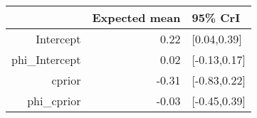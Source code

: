 \begin{tabular}{rrl}
  \hline
 & Expected mean & 95\% CrI \\ 
  \hline
Intercept & 0.22 & [0.04,0.39] \\ 
  phi\_Intercept & 0.02 & [-0.13,0.17] \\ 
  cprior & -0.31 & [-0.83,0.22] \\ 
  phi\_cprior & -0.03 & [-0.45,0.39] \\ 
   \hline
\end{tabular}

